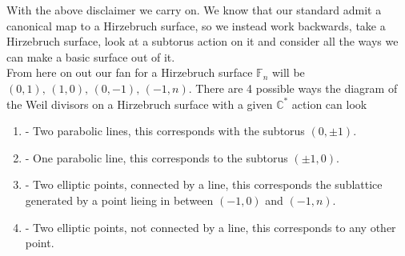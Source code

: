 \documentclass[11pt]{amsart}
\theoremstyle{plain}
\begin{document}
With the above disclaimer we carry on. We know that our standard admit a canonical map to a Hirzebruch surface, so we instead work backwards, take a Hirzebruch surface, look at a subtorus action on it and consider all the ways we can make a basic surface out of it.
\\
From here on out our fan for a Hirzebruch surface $\mathbb{F}_n$ will be $(0,1), \, (1,0), \, (0,-1), \, (-1, n)$. There are 4 possible ways the diagram of the Weil divisors on a Hirzebruch surface with a given $\mathbb{C}^*$ action can look
\begin{enumerate}[label =\Alph*]
\item - Two parabolic lines, this corresponds with the subtorus $(0, \pm 1)$.
\item - One parabolic line, this corresponds to the subtorus $(\pm 1, 0)$.
\item - Two elliptic points, connected by a line, this corresponds the sublattice generated by a point lieing in between $(-1,0)$ and $(-1, n)$.
\item - Two elliptic points, not connected by a line, this corresponds to any other point.
\end{enumerate} 
\end{document}
